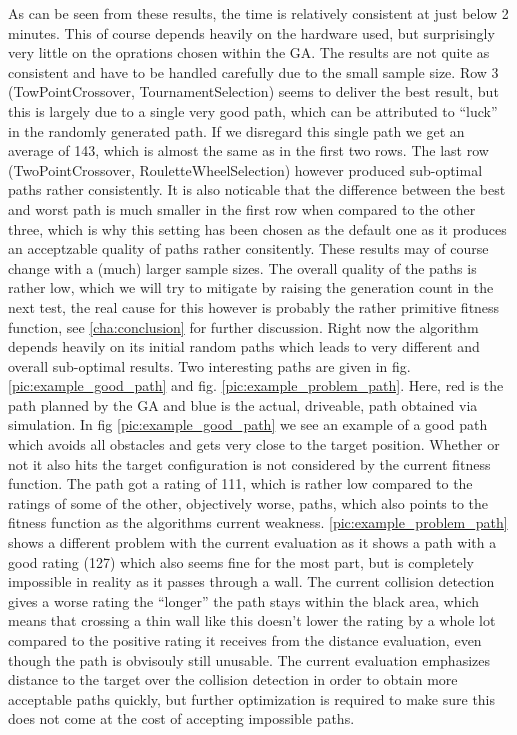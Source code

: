 As can be seen from these results, the time is relatively consistent at just below 2 minutes. This of course depends heavily on the hardware used, but surprisingly very little on the oprations chosen within the GA. The results are not quite as consistent and have to be handled carefully due to the small sample size. Row 3 (TowPointCrossover, TournamentSelection) seems to deliver the best result, but this is largely due to a single very good path, which can be attributed to "`luck"' in the randomly generated path. If we disregard this single path we get an average of 143, which is almost the same as in the first two rows. The last row (TwoPointCrossover, RouletteWheelSelection) however produced sub-optimal paths rather consistently. It is also noticable that the difference between the best and worst path is much smaller in the first row when compared to the other three, which is why this setting has been chosen as the default one as it produces an acceptzable quality of paths rather consitently. These results may of course change with a (much) larger sample sizes.
The overall quality of the paths is rather low, which we will try to mitigate by raising the generation count in the next test, the real cause for this however is probably the rather primitive fitness function, see \ref{cha:conclusion} for further discussion. Right now the algorithm depends heavily on its initial random paths which leads to very different and overall sub-optimal results.
Two interesting paths are given in fig. \ref{pic:example_good_path} and fig. \ref{pic:example_problem_path}. Here, red is the path planned by the GA and blue is the actual, driveable, path obtained via simulation. In fig \ref{pic:example_good_path} we see an example of a good path which avoids all obstacles and gets very close to the target position. Whether or not it also hits the target configuration is not considered by the current fitness function. The path got a rating of 111, which is rather low compared to the ratings of some of the other, objectively worse, paths, which also points to the fitness function as the algorithms current weakness. \ref{pic:example_problem_path} shows a different problem with the current evaluation as it shows a path with a good rating (127) which also seems fine for the most part, but is completely impossible in reality as it passes through a wall. The current collision detection gives a worse rating the "`longer"' the path stays within the black area, which means that crossing a thin wall like this doesn't lower the rating by a whole lot compared to the positive rating it receives from the distance evaluation, even though the path is obvisouly still unusable. The current evaluation emphasizes distance to the target over the collision detection in order to obtain more acceptable paths quickly, but further optimization is required to make sure this does not come at the cost of accepting impossible paths.

